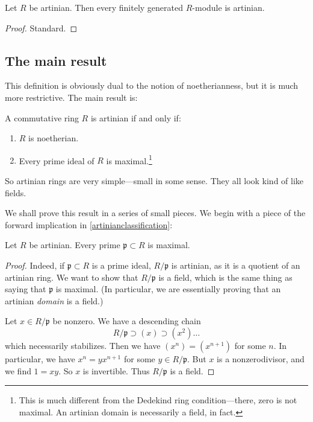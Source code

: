 \begin{corollary} 
Let $R$ be artinian. Then every finitely generated $R$-module is artinian.
\end{corollary} 
\begin{proof} 
Standard.
\end{proof} 

\subsection{The main result}
This definition is obviously dual to the notion of noetherianness, but it is
much more restrictive.  
The main result is:

\begin{theorem} \label{artinianclassification}
A commutative ring $R$ is artinian if and only if:
\begin{enumerate}
\item $R$ is noetherian. 
\item Every prime ideal of $R$ is maximal.\footnote{This is much different from
the Dedekind ring condition---there, zero is not maximal. An artinian domain is
necessarily a field, in fact.}
\end{enumerate}
\end{theorem} 


So artinian rings are very simple---small in some sense.
They all look kind of like fields.

We shall prove this result in a series of small pieces. We begin with a piece
of the forward implication in \cref{artinianclassification}:
\begin{lemma} Let $R$ be artinian. 
Every prime $\mathfrak{p} \subset R$ is maximal.
\end{lemma} 
\begin{proof} 
Indeed, if $\mathfrak{p} \subset R$ is a prime ideal, $R/\mathfrak{p}$ is
artinian, as it is a quotient of an artinian ring. We want to show that
$R/\mathfrak{p}$ is a field,
which is the same thing as saying that $\mathfrak{p}$ is maximal.
(In particular, we are essentially proving that an artinian \emph{domain} is a
field.)

Let $x \in
R/\mathfrak{p}$ be nonzero. We have a descending chain
\[ R/\mathfrak{p} \supset (x) \supset (x^{2}) \dots  \]
which necessarily stabilizes. Then we have $(x^n) = (x^{n+1})$ for some $n$. In
particular, we have $x^n = y x^{n+1}$ for some $y \in R/\mathfrak{p}$. But $x$
is a nonzerodivisor, and  we find $ 1 = xy$. So $x$ is invertible. Thus
$R/\mathfrak{p}$ is a field.
\end{proof} 

